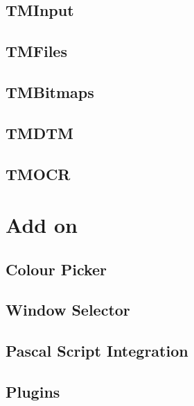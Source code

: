 \documentclass[a4paper]{report}
\begin{document}
\section{TMInput}

\section{TMFiles}

\section{TMBitmaps}

\section{TMDTM}

\section{TMOCR}

\chapter{Add on}

\section{Colour Picker}

\section{Window Selector}

\section{Pascal Script Integration}

\section{Plugins}
\end{document}
